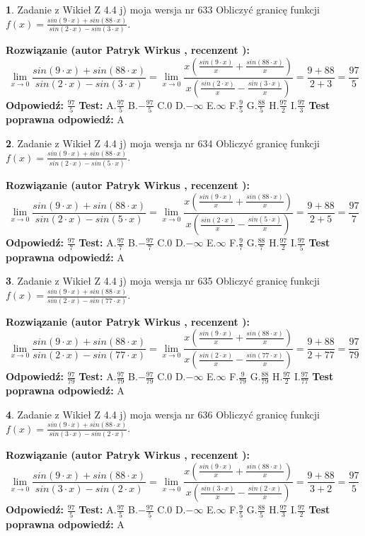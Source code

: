 \documentclass[12pt, a4paper]{article}
\theoremstyle{definition} %
\newtheorem{zad}{}
\newcommand{\zadStart}[1]{\begin{zad}#1\newline}
\newcommand{\zadStop}{\end{zad}}
\newcommand{\rozwStart}[2]{\noindent \textbf{Rozwiązanie (autor #1 , recenzent #2): }\newline}
\newcommand{\rozwStop}{\newline}
\newcommand{\odpStart}{\noindent \textbf{Odpowiedź:}\newline}
\newcommand{\odpStop}{\newline}
\newcommand{\testStart}{\noindent \textbf{Test:}\newline}
\newcommand{\testStop}{\newline}
\newcommand{\kluczStart}{\noindent \textbf{Test poprawna odpowiedź:}\newline}
\newcommand{\kluczStop}{\newline}
\begin{document}
\zadStart{Zadanie z Wikieł Z 4.4 j) moja wersja nr 633}
Obliczyć granicę funkcji $f(x)=\frac{sin(9\cdot x) +sin(88\cdot x)}{sin(2\cdot x) -sin(3\cdot x)}$.
\zadStop
\rozwStart{Patryk Wirkus}{}
$$\lim\limits_{x\to 0}\frac{sin(9\cdot x) +sin(88\cdot x)}{sin(2\cdot x) -sin(3\cdot x)}=\lim\limits_{x\to 0}\frac{x(\frac{sin(9\cdot x)}{x}+\frac{sin(88\cdot x)}{x})}{x(\frac{sin(2\cdot x)}{x}-\frac{sin(3\cdot x)}{x})}=\frac{9+88}{2+3} = \frac{97}{5}$$
\rozwStop
\odpStart
$\frac{97}{5}$
\odpStop
\testStart
A.$\frac{97}{5}$
B.$-\frac{97}{5}$
C.$0$
D.$-\infty$
E.$\infty$
F.$\frac{9}{5}$
G.$\frac{88}{5}$
H.$\frac{97}{2}$
I.$\frac{97}{3}$
\testStop
\kluczStart
A
\kluczStop



\zadStart{Zadanie z Wikieł Z 4.4 j) moja wersja nr 634}
Obliczyć granicę funkcji $f(x)=\frac{sin(9\cdot x) +sin(88\cdot x)}{sin(2\cdot x) -sin(5\cdot x)}$.
\zadStop
\rozwStart{Patryk Wirkus}{}
$$\lim\limits_{x\to 0}\frac{sin(9\cdot x) +sin(88\cdot x)}{sin(2\cdot x) -sin(5\cdot x)}=\lim\limits_{x\to 0}\frac{x(\frac{sin(9\cdot x)}{x}+\frac{sin(88\cdot x)}{x})}{x(\frac{sin(2\cdot x)}{x}-\frac{sin(5\cdot x)}{x})}=\frac{9+88}{2+5} = \frac{97}{7}$$
\rozwStop
\odpStart
$\frac{97}{7}$
\odpStop
\testStart
A.$\frac{97}{7}$
B.$-\frac{97}{7}$
C.$0$
D.$-\infty$
E.$\infty$
F.$\frac{9}{7}$
G.$\frac{88}{7}$
H.$\frac{97}{2}$
I.$\frac{97}{5}$
\testStop
\kluczStart
A
\kluczStop



\zadStart{Zadanie z Wikieł Z 4.4 j) moja wersja nr 635}
Obliczyć granicę funkcji $f(x)=\frac{sin(9\cdot x) +sin(88\cdot x)}{sin(2\cdot x) -sin(77\cdot x)}$.
\zadStop
\rozwStart{Patryk Wirkus}{}
$$\lim\limits_{x\to 0}\frac{sin(9\cdot x) +sin(88\cdot x)}{sin(2\cdot x) -sin(77\cdot x)}=\lim\limits_{x\to 0}\frac{x(\frac{sin(9\cdot x)}{x}+\frac{sin(88\cdot x)}{x})}{x(\frac{sin(2\cdot x)}{x}-\frac{sin(77\cdot x)}{x})}=\frac{9+88}{2+77} = \frac{97}{79}$$
\rozwStop
\odpStart
$\frac{97}{79}$
\odpStop
\testStart
A.$\frac{97}{79}$
B.$-\frac{97}{79}$
C.$0$
D.$-\infty$
E.$\infty$
F.$\frac{9}{79}$
G.$\frac{88}{79}$
H.$\frac{97}{2}$
I.$\frac{97}{77}$
\testStop
\kluczStart
A
\kluczStop



\zadStart{Zadanie z Wikieł Z 4.4 j) moja wersja nr 636}
Obliczyć granicę funkcji $f(x)=\frac{sin(9\cdot x) +sin(88\cdot x)}{sin(3\cdot x) -sin(2\cdot x)}$.
\zadStop
\rozwStart{Patryk Wirkus}{}
$$\lim\limits_{x\to 0}\frac{sin(9\cdot x) +sin(88\cdot x)}{sin(3\cdot x) -sin(2\cdot x)}=\lim\limits_{x\to 0}\frac{x(\frac{sin(9\cdot x)}{x}+\frac{sin(88\cdot x)}{x})}{x(\frac{sin(3\cdot x)}{x}-\frac{sin(2\cdot x)}{x})}=\frac{9+88}{3+2} = \frac{97}{5}$$
\rozwStop
\odpStart
$\frac{97}{5}$
\odpStop
\testStart
A.$\frac{97}{5}$
B.$-\frac{97}{5}$
C.$0$
D.$-\infty$
E.$\infty$
F.$\frac{9}{5}$
G.$\frac{88}{5}$
H.$\frac{97}{3}$
I.$\frac{97}{2}$
\testStop
\kluczStart
A
\kluczStop
\end{document}
